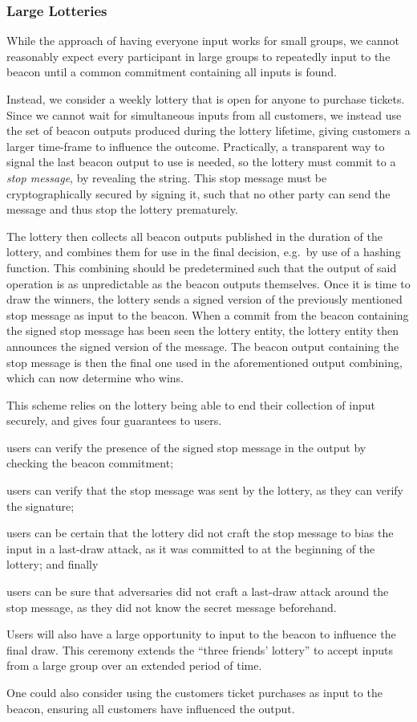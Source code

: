 \subsubsection{Large Lotteries}%
\label{ssub:large_lotteries}
While the approach of having everyone input works for small groups, we cannot reasonably expect every participant in large groups to repeatedly input to the beacon until a common commitment containing all inputs is found.

Instead, we consider a weekly lottery that is open for anyone to purchase tickets.
Since we cannot wait for simultaneous inputs from all customers, we instead use the set of beacon outputs produced during the lottery lifetime, giving customers a larger time-frame to influence the outcome.
Practically, a transparent way to signal the last beacon output to use is needed, so the lottery must commit to a \textit{stop message}, by revealing the string.
This stop message must be cryptographically secured by signing it, such that no other party can send the message and thus stop the lottery prematurely.

The lottery then collects all beacon outputs published in the duration of the lottery, and combines them for use in the final decision, e.g.\ by use of a hashing function.
This combining should be predetermined such that the output of said operation is as unpredictable as the beacon outputs themselves.
Once it is time to draw the winners, the lottery sends a signed version of the previously mentioned stop message as input to the beacon.
When a commit from the beacon containing the signed stop message has been seen the lottery entity, the lottery entity then announces the signed version of the message.
The beacon output containing the stop message is then the final one used in the aforementioned output combining, which can now determine who wins.

This scheme relies on the lottery being able to end their collection of input securely, and gives four guarantees to users.
\begin{enumberate*}
\item users can verify the presence of the signed stop message in the output by checking the beacon commitment;
\item users can verify that the stop message was sent by the lottery, as they can verify the signature;
\item users can be certain that the lottery did not craft the stop message to bias the input in a last-draw attack, as it was committed to at the beginning of the lottery; and finally
\item users can be sure that adversaries did not craft a last-draw attack around the stop message, as they did not know the secret message beforehand.
\end{enumberate*}

Users will also have a large opportunity to input to the beacon to influence the final draw.
This ceremony extends the \enquote{three friends' lottery} to accept inputs from a large group over an extended period of time.

One could also consider using the customers ticket purchases as input to the beacon, ensuring all customers have influenced the output.
